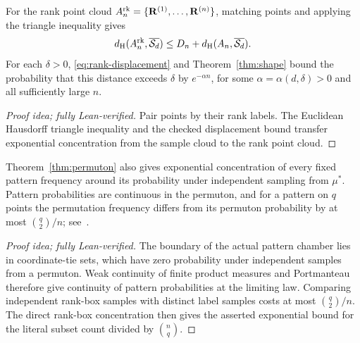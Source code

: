 \documentclass[11pt,letterpaper]{article}
\begin{document}
\begin{remark}\label{rem:rank-hausdorff}
      For the rank point cloud $A_n^{\mathrm{rk}}=\{\mathbf R^{(1)},\ldots,\mathbf R^{(n)}\}$, matching points and applying the triangle inequality gives
      \[
            d_{\rm H}(A_n^{\mathrm{rk}},\overline{\mathcal S_d})
            \le D_n+d_{\rm H}(A_n,\overline{\mathcal S_d}).
      \]
      For each $\delta>0$, \eqref{eq:rank-displacement} and Theorem~\ref{thm:shape} bound the probability that this distance exceeds $\delta$ by $e^{-\alpha n}$, for some $\alpha=\alpha(d,\delta)>0$ and all sufficiently large $n$.
\end{remark}

\begin{proof}[Proof idea; fully Lean-verified]
Pair points by their rank labels. The Euclidean Hausdorff triangle inequality and the checked displacement bound transfer exponential concentration from the sample cloud to the rank point cloud.
\end{proof}


\begin{remark}\label{rem:pattern-concentration}
      Theorem~\ref{thm:permuton} also gives exponential concentration of every fixed pattern frequency around its probability under independent sampling from $\mu^\ast$. Pattern probabilities are continuous in the permuton, and for a pattern on $q$ points the permutation frequency differs from its permuton probability by at most $\binom{q}{2}/n$; see~\cite[Lemma~2.3 and Proposition~2.4]{BL}.
\end{remark}

\begin{proof}[Proof idea; fully Lean-verified]
The boundary of the actual pattern chamber lies in coordinate-tie sets, which have zero probability under independent samples from a permuton. Weak continuity of finite product measures and Portmanteau therefore give continuity of pattern probabilities at the limiting law. Comparing independent rank-box samples with distinct label samples costs at most $\binom q2/n$. The direct rank-box concentration then gives the asserted exponential bound for the literal subset count divided by $\binom nq$.
\end{proof}
\end{document}
